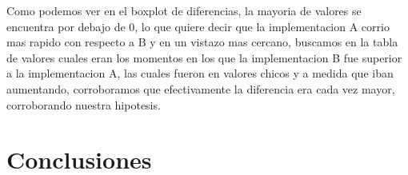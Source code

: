 \documentclass[a4paper]{article}
\begin{document}
Como podemos ver en el boxplot de diferencias, la mayoria de valores se encuentra por debajo de 0, lo que quiere decir que la implementacion A corrio mas rapido con respecto a B y en un vistazo mas cercano, buscamos en la tabla de valores cuales eran los momentos en los que la implementacion B fue superior a la implementacion A, las cuales fueron en valores chicos y a medida que iban aumentando, corroboramos que efectivamente la diferencia era cada vez mayor, corroborando nuestra hipotesis. 

\section{Conclusiones}
\end{document}
